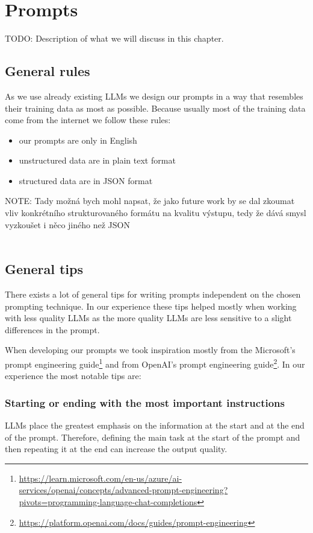 \chapter{Prompts}

TODO: Description of what we will discuss in this chapter.

\section{General rules}
As we use already existing LLMs we design our prompts in a way that resembles their training data as most as possible. Because usually most of the training data come from the internet we follow these rules:
\begin{itemize}
\item our prompts are only in English
\item unstructured data are in plain text format
\item structured data are in JSON format \
\end{itemize}

NOTE: Tady možná bych mohl napsat, že jako future work by se dal zkoumat vliv konkrétního strukturovaného formátu na kvalitu výstupu, tedy že dává smysl vyzkoušet i něco jiného než JSON \\~\\


\section{General tips}
There exists a lot of general tips for writing prompts independent on the chosen prompting technique. In our experience these tips helped mostly when working with less quality LLMs as the more quality LLMs are less sensitive to a slight differences in the prompt.

When developing our prompts we took inspiration mostly from the Microsoft's prompt engineering guide\footnote{\url{https://learn.microsoft.com/en-us/azure/ai-services/openai/concepts/advanced-prompt-engineering?pivots=programming-language-chat-completions}} and from OpenAI's prompt engineering guide\footnote{\url{https://platform.openai.com/docs/guides/prompt-engineering}}. In our experience the most notable tips are:



\subsection{Starting or ending with the most important instructions}
LLMs place the greatest emphasis on the information at the start and at the end of the prompt. Therefore, defining the main task at the start of the prompt and then repeating it at the end can increase the output quality.


